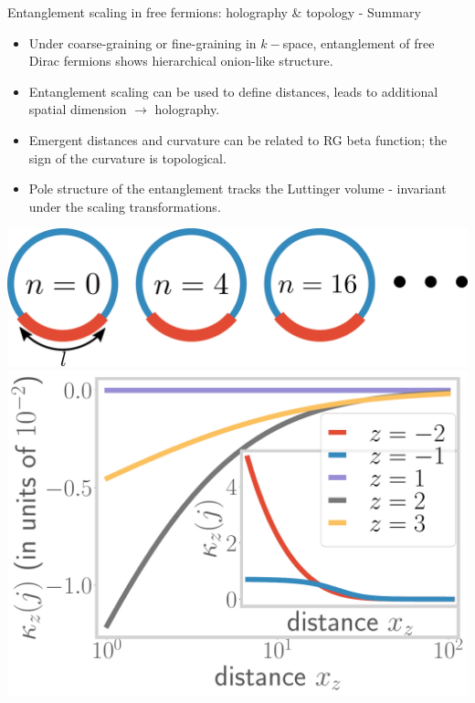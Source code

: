 \documentclass[8pt,aspectratio=169]{beamer}
\begin{document}
\begin{frame}{Entanglement scaling in free fermions: holography \& topology - Summary}
\hspace*{-40pt}
\begin{minipage}{0.65\textwidth}
\begin{itemize}
	\item Under coarse-graining or fine-graining in \(k-\)space, entanglement of free Dirac fermions shows hierarchical onion-like structure.\\[10pt]
	\item Entanglement scaling can be used to define distances, leads to additional spatial dimension \(\longrightarrow\) holography.\\[10pt]
	\item Emergent distances and curvature can be related to RG beta function; the sign of the curvature is topological.\\[10pt]
	\item Pole structure of the entanglement tracks the Luttinger volume - invariant under the scaling transformations.
\end{itemize}
\end{minipage}
\hspace*{5pt}
\begin{minipage}{0.41\textwidth}
\includegraphics[width=\textwidth]{figures/A_mi.pdf}
\includegraphics[width=\textwidth]{curvature-pos.pdf}
\end{minipage}
\hspace*{-40pt}
\end{frame}
\end{document}
